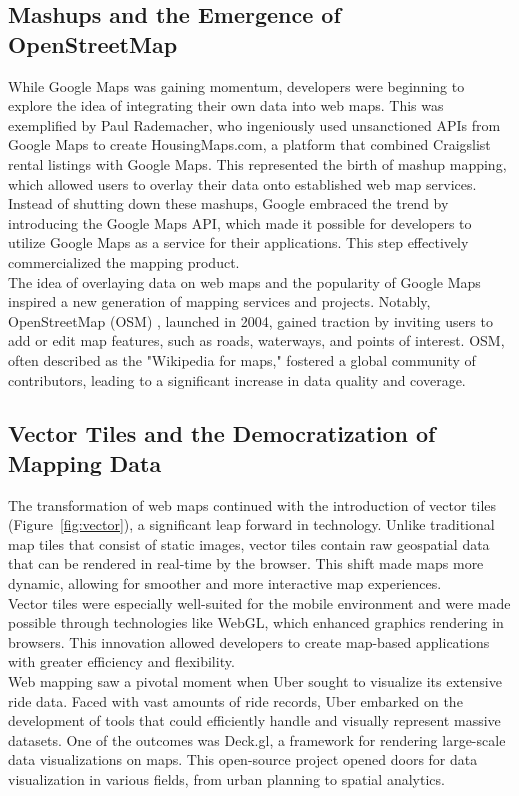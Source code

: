 \documentclass[10pt,oneside,english,a4paper]{article}
\begin{document}
\subsection{Mashups and the Emergence of OpenStreetMap} \label{history:mashups}
While Google Maps was gaining momentum, developers were beginning to explore the idea of integrating their own data into web maps. This was exemplified by Paul Rademacher, who ingeniously used unsanctioned APIs from Google Maps to create HousingMaps.com, a platform that combined Craigslist rental listings with Google Maps. This represented the birth of mashup mapping, which allowed users to overlay their data onto established web map services.
\\Instead of shutting down these mashups, Google embraced the trend by introducing the Google Maps API, which made it possible for developers to utilize Google Maps as a service for their applications. This step effectively commercialized the mapping product.
\\The idea of overlaying data on web maps and the popularity of Google Maps inspired a new generation of mapping services and projects. Notably, OpenStreetMap (OSM) , launched in 2004, gained traction by inviting users to add or edit map features, such as roads, waterways, and points of interest. OSM, often described as the "Wikipedia for maps," fostered a global community of contributors, leading to a significant increase in data quality and coverage.

\subsection{Vector Tiles and the Democratization of Mapping Data} \label{history:vector}
The transformation of web maps continued with the introduction of vector tiles (Figure~\ref{fig:vector}), a significant leap forward in technology. Unlike traditional map tiles that consist of static images, vector tiles contain raw geospatial data that can be rendered in real-time by the browser. This shift made maps more dynamic, allowing for smoother and more interactive map experiences.
\\Vector tiles were especially well-suited for the mobile environment and were made possible through technologies like WebGL, which enhanced graphics rendering in browsers. This innovation allowed developers to create map-based applications with greater efficiency and flexibility.
\\Web mapping saw a pivotal moment when Uber sought to visualize its extensive ride data. Faced with vast amounts of ride records, Uber embarked on the development of tools that could efficiently handle and visually represent massive datasets. One of the outcomes was Deck.gl, a framework for rendering large-scale data visualizations on maps. This open-source project opened doors for data visualization in various fields, from urban planning to spatial analytics.
\end{document}
